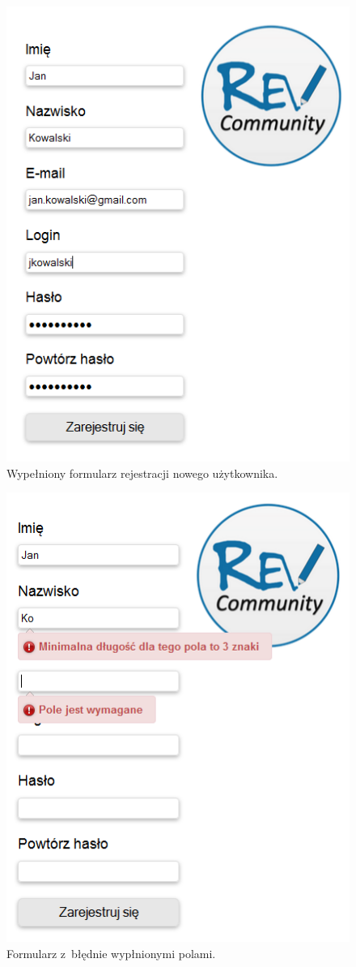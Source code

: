 \begin{figure}[h]
	\centering
	\includegraphics[scale=0.6]{images/rejestracja.png}
	\caption{Wypełniony formularz rejestracji nowego użytkownika.}
\end{figure}

\begin{figure}[h]
	\centering
	\includegraphics[scale=0.6]{images/rejestracja_walidacja.png}
	\caption{Formularz z~błędnie wypłnionymi polami.}
\end{figure}


